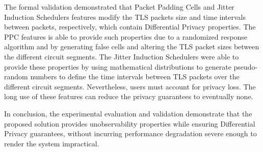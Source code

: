 The formal validation demonstrated that Packet Padding Cells and Jitter Induction Schedulers features modify the TLS packets size and time intervals between packets, respectively, which contain Differential Privacy properties. The PPC features is able to provide such properties due to a randomized response algorithm and by generating false cells and altering the TLS packet sizes between the different circuit segments. The Jitter Induction Schedulers were able to provide these properties by using mathematical distributions to generate pseudo-random numbers to define the time intervals between TLS packets over the different circuit segments. Nevertheless, users must account for privacy loss. The long use of these features can reduce the privacy guarantees to eventually none.

In conclusion, the experimental evaluation and validation demonstrate that the proposed solution provides unobservability properties while ensuring Differential Privacy guarantees, without incurring performance degradation severe enough to render the system impractical.

